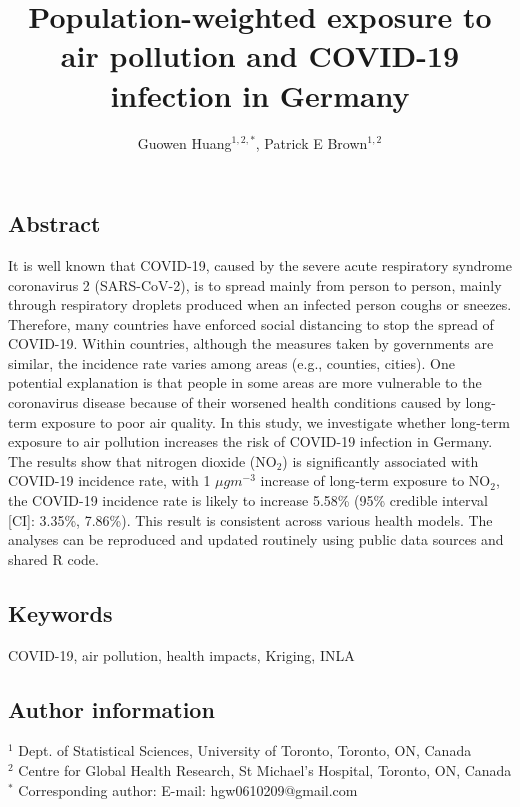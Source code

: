 \documentclass[12,]{article}
\title{Population-weighted exposure to air pollution and COVID-19 infection in
Germany}
\author{Guowen Huang\(^{1,2,*}\), Patrick E Brown\(^{1,2}\)}
\date{}
\begin{document}
\maketitle

\hypertarget{abstract}{%
\subsection*{Abstract}\label{abstract}}

It is well known that COVID-19, caused by the severe acute respiratory
syndrome coronavirus 2 (SARS-CoV-2), is to spread mainly from person to
person, mainly through respiratory droplets produced when an infected
person coughs or sneezes. Therefore, many countries have enforced social
distancing to stop the spread of COVID-19. Within countries, although
the measures taken by governments are similar, the incidence rate varies
among areas (e.g., counties, cities). One potential explanation is that
people in some areas are more vulnerable to the coronavirus disease
because of their worsened health conditions caused by long-term exposure
to poor air quality. In this study, we investigate whether long-term
exposure to air pollution increases the risk of COVID-19 infection in
Germany. The results show that nitrogen dioxide (NO\(_2\)) is
significantly associated with COVID-19 incidence rate, with 1
\(\mu gm^{-3}\) increase of long-term exposure to NO\(_2\), the COVID-19
incidence rate is likely to increase 5.58\% (95\% credible interval
{[}CI{]}: 3.35\%, 7.86\%). This result is consistent across various
health models. The analyses can be reproduced and updated routinely
using public data sources and shared R code.

\hypertarget{keywords}{%
\subsection*{Keywords}\label{keywords}}

COVID-19, air pollution, health impacts, Kriging, INLA

\hypertarget{author-information}{%
\subsection*{Author information}\label{author-information}}

\(^1\) Dept. of Statistical Sciences, University of Toronto, Toronto,
ON, Canada\\
\(^2\) Centre for Global Health Research, St Michael's Hospital,
Toronto, ON, Canada\\
\(^*\) Corresponding author: E-mail: hgw0610209@gmail.com
\end{document}
